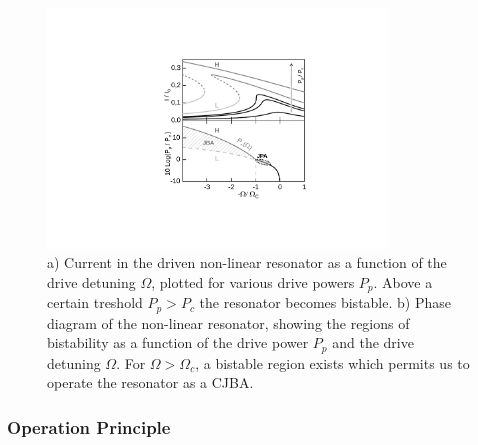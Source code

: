 %
%
 
\begin{figure}	
	\includegraphics[width=9cm]{"./material/figures/introduction/jba_phasediagram"}
	\caption{a) Current in the driven non-linear resonator as a function of the drive detuning $\Omega$, plotted for various drive powers $P_p$. Above a certain treshold $P_p>P_c$ the resonator becomes bistable. b) Phase diagram of the non-linear resonator, showing the regions of bistability as a function of the drive power $P_p$ and the drive detuning $\Omega$. For $\Omega>\Omega_c$, a bistable region exists which permits us to operate the resonator as a CJBA.}
	\label{fig:jba_curves}
\end{figure}

\subsubsection{Operation Principle}

